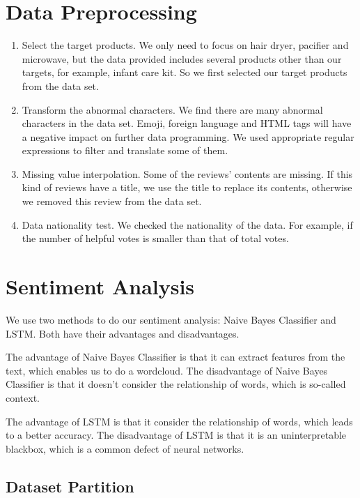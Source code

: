 \documentclass{mcmthesis}
\begin{document}
\section{Data Preprocessing}

\begin{enumerate}
  \item Select the target products. We only need to focus on hair dryer, pacifier and microwave, but the data provided includes several products other than our targets, for example, infant care kit. So we first selected our target products from the data set.
  \item Transform the abnormal characters. We find there are many abnormal characters in the data set. Emoji, foreign language and HTML tags will have a negative impact on further data programming. We used appropriate regular expressions to filter and translate some of them.
  \item Missing value interpolation. Some of the reviews’ contents are missing. If this kind of reviews have a title, we use the title to replace its contents, otherwise we removed this review from the data set.
  \item Data nationality test. We checked the nationality of the data. For example, if the number of helpful votes is smaller than that of total votes.
\end{enumerate}


\section{Sentiment Analysis}

We use two methods to do our sentiment analysis: Naive Bayes Classifier 
and LSTM. Both have their advantages and disadvantages.

The advantage of Naive Bayes Classifier is that it can extract features from the text, which enables us to do a wordcloud. The disadvantage of Naive Bayes Classifier is that it doesn't consider the relationship of words, which is so-called context. 


The advantage of LSTM is that it consider the relationship of words, which leads to a better accuracy. The disadvantage of LSTM is that it is an uninterpretable blackbox, which is a common defect of neural networks.


\subsection{Dataset Partition}
\end{document}
